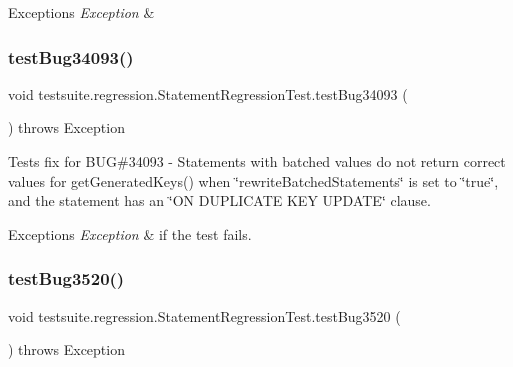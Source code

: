 \begin{DoxyExceptions}{Exceptions}
{\em Exception} & \\
\hline
\end{DoxyExceptions}
\mbox{\label{classtestsuite_1_1regression_1_1_statement_regression_test_accd5c83c1b95ec64b7d7868f9ea2be99}} 
\subsubsection{\texorpdfstring{test\+Bug34093()}{testBug34093()}}
{\footnotesize\ttfamily void testsuite.\+regression.\+Statement\+Regression\+Test.\+test\+Bug34093 (\begin{DoxyParamCaption}{ }\end{DoxyParamCaption}) throws Exception}

Tests fix for B\+UG\#34093 -\/ Statements with batched values do not return correct values for get\+Generated\+Keys() when \char`\"{}rewrite\+Batched\+Statements\char`\"{} is set to \char`\"{}true\char`\"{}, and the statement has an \char`\"{}\+O\+N D\+U\+P\+L\+I\+C\+A\+T\+E K\+E\+Y U\+P\+D\+A\+T\+E\char`\"{} clause.


\begin{DoxyExceptions}{Exceptions}
{\em Exception} & if the test fails. \\
\hline
\end{DoxyExceptions}
\mbox{\label{classtestsuite_1_1regression_1_1_statement_regression_test_a18dbb1cd4de47766732bd187315d645c}} 
\subsubsection{\texorpdfstring{test\+Bug3520()}{testBug3520()}}
{\footnotesize\ttfamily void testsuite.\+regression.\+Statement\+Regression\+Test.\+test\+Bug3520 (\begin{DoxyParamCaption}{ }\end{DoxyParamCaption}) throws Exception}

